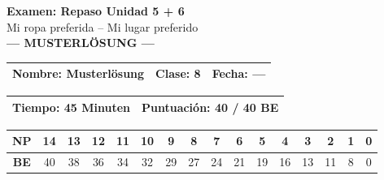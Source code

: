 \documentclass[11pt, a4paper]{article}
\newcommand{\klasse}{8}
\newcommand{\maxpunkte}{40}
\newcommand{\zeit}{45 Minuten}
\newcommand{\lsg}[1]{\textcolor{loesung}{\textbf{#1}}}
\begin{document}

\begin{center}
    {\Large\bfseries\textcolor{spanisch}{Examen: Repaso Unidad 5 + 6}}\\[4pt]
    {\small Mi ropa preferida -- Mi lugar preferido}\\[4pt]
    {\large\textcolor{loesung}{\textbf{--- MUSTERLÖSUNG ---}}}
\end{center}

\vspace{4pt}

\begin{tabularx}{\textwidth}{|X|l|l|}
\hline
\textbf{Nombre:} \lsg{Musterlösung} &
\textbf{Clase:} \klasse &
\textbf{Fecha:} \lsg{---} \\
\hline
\end{tabularx}

\vspace{4pt}

\begin{tabularx}{\textwidth}{|X|X|}
\hline
\textbf{Tiempo:} \zeit &
\textbf{Puntuación:} \lsg{40} / \maxpunkte{} BE \\
\hline
\end{tabularx}

\vspace{6pt}


\begin{center}
\footnotesize
\begin{tabular}{|c|c|c|c|c|c|c|c|c|c|c|c|c|c|c|c|}
\hline
\textbf{NP} & 14 & 13 & 12 & 11 & 10 & 9 & 8 & 7 & 6 & 5 & 4 & 3 & 2 & 1 & 0 \\
\hline
\textbf{BE} & 40 & 38 & 36 & 34 & 32 & 29 & 27 & 24 & 21 & 19 & 16 & 13 & 11 & 8 & 0 \\
\hline
\end{tabular}
\end{center}

\vspace{8pt}

\end{document}

